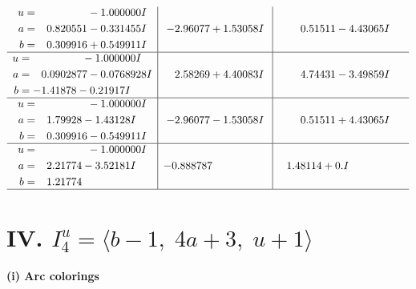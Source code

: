 \documentclass[1p]{elsarticle_modified}
\theoremstyle{definition}
\begin{document}
$$\begin{array}{c|c|c}
\begin{aligned}
u &= \phantom{-0.000000 } -1.000000 I \\
a &= \phantom{-}0.820551 - 0.331455 I \\
b &= \phantom{-}0.309916 + 0.549911 I\end{aligned}
 & -2.96077 + 1.53058 I & \phantom{-}0.51511 - 4.43065 I \\ \hline\begin{aligned}
u &= \phantom{-0.000000 } -1.000000 I \\
a &= \phantom{-}0.0902877 - 0.0768928 I \\
b &= -1.41878 - 0.21917 I\end{aligned}
 & \phantom{-}2.58269 + 4.40083 I & \phantom{-}4.74431 - 3.49859 I \\ \hline\begin{aligned}
u &= \phantom{-0.000000 } -1.000000 I \\
a &= \phantom{-}1.79928 - 1.43128 I \\
b &= \phantom{-}0.309916 - 0.549911 I\end{aligned}
 & -2.96077 - 1.53058 I & \phantom{-}0.51511 + 4.43065 I \\ \hline\begin{aligned}
u &= \phantom{-0.000000 } -1.000000 I \\
a &= \phantom{-}2.21774 - 3.52181 I \\
b &= \phantom{-}1.21774\phantom{ +0.000000I}\end{aligned}
 & -0.888787\phantom{ +0.000000I} & \phantom{-}1.48114 + 0. I\phantom{ +0.000000I}\\
 \hline 
 \end{array}$$\newpage\newpage\renewcommand{\arraystretch}{1}
\centering \section*{IV. $I^u_{4}= \langle b-1,\;4 a+3,\;u+1 \rangle$}
\flushleft \textbf{(i) Arc colorings}\\
\end{document}
